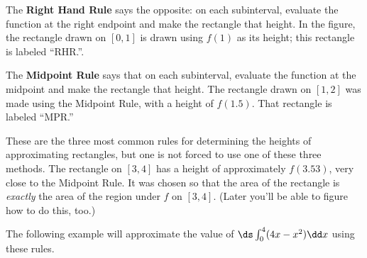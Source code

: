 The \textbf{Right Hand Rule} says the opposite: on each subinterval, evaluate the function at the right endpoint and make the rectangle that height. In the figure, the rectangle drawn on $[0,1]$ is drawn using $f(1)$ as its height; this rectangle is labeled ``RHR.''.

The \textbf{Midpoint Rule} says that on each subinterval, evaluate the function at the midpoint and make the rectangle that height. The rectangle drawn on $[1,2]$ was made using the Midpoint Rule, with a height of $f(1.5)$. That rectangle is labeled ``MPR.''

These are the three most common rules for determining the heights of approximating rectangles, but one is not forced to use one of these three methods. The rectangle on $[3,4]$ has a height of approximately $f(3.53)$, very close to the Midpoint Rule. It was chosen so that the area of the rectangle is \emph{exactly} the area of the region under $f$ on $[3,4]$. (Later you'll be able to figure how to do this, too.)

The following example will approximate the value of $\ds\int_0^4 (4x-x^2)\dd x$ using these rules.

